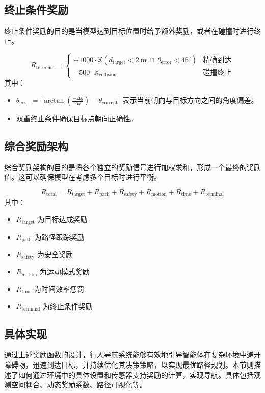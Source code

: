 	\subsection{终止条件奖励}
	终止条件奖励的目的是当模型达到目标位置时给予额外奖励，或者在碰撞时进行终止。
	
	\begin{equation}
	R_{\text{terminal}} =
	\begin{cases}
	+1000 \cdot \mathbb{X}(d_{\text{target}} < 2\ \text{m}\ \cap\ \theta_{\text{error}} < 45^\circ) & \text{精确到达} \\
	-500 \cdot \mathbb{X}_{\text{collision}} & \text{碰撞终止}
	\end{cases}
	\end{equation}
	其中：
	\begin{itemize}
	    \item \( \theta_{\text{error}} = \left| \arctan\left(\frac{-\Delta y}{\Delta x}\right) - \theta_{\text{current}} \right| \) 表示当前朝向与目标方向之间的角度偏差。
	    \item 双重终止条件确保目标点朝向正确性。
	\end{itemize}
	
	\subsection{综合奖励架构}
	综合奖励架构的目的是将各个独立的奖励信号进行加权求和，形成一个最终的奖励值。这可以确保模型在考虑多个目标时进行平衡。
	
	\begin{equation}
	R_{\text{total}} = R_{\text{target}} + R_{\text{path}} + R_{\text{safety}} + R_{\text{motion}} + R_{\text{time}} + R_{\text{terminal}}
	\end{equation}
	其中：
	\begin{itemize}
	    \item \( R_{\text{target}} \) 为目标达成奖励
	    \item \( R_{\text{path}} \) 为路径跟踪奖励
	    \item \( R_{\text{safety}} \) 为安全奖励
	    \item \( R_{\text{motion}} \) 为运动模式奖励
	    \item \( R_{\text{time}} \) 为时间效率惩罚
	    \item \( R_{\text{terminal}} \) 为终止条件奖励
	\end{itemize}
	
	\subsection{具体实现}
	通过上述奖励函数的设计，行人导航系统能够有效地引导智能体在复杂环境中避开障碍物，迅速到达目标，并持续优化其决策策略，以实现最优路径规划。本节则描述了如何通过环境中的具体设置和传感器支持奖励的计算，实现导航。具体包括观测空间耦合、动态奖励系数、路径可视化等。
	
